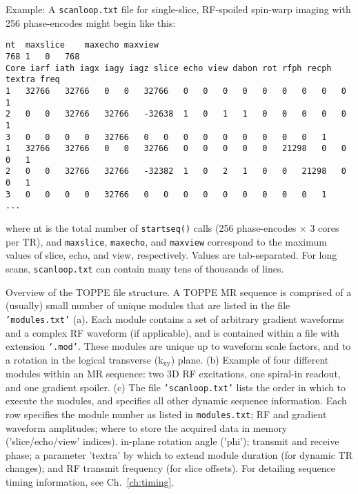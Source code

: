 \begin{comment}
\newcommand\modulenum{1}
\newcommand\rfamp{2}
\newcommand\thetaamp{3}
\newcommand\gxamp{4}
\newcommand\gyamp{5}
\newcommand\gzamp{6}
\newcommand\dabslice{7}
\newcommand\dabecho{8}
\newcommand\dabview{9}
\newcommand\dabmode{10}
\newcommand\inplanerot{11}
\newcommand\txphase{12}
\newcommand\recphase{13}
\newcommand\textra{14}
\newcommand\rffreq{15}
\newcommand\waveformnum{16}
\end{comment}

Example: A {\tt scanloop.txt} file for single-slice, RF-spoiled spin-warp imaging with 256 phase-encodes might begin like this:
\begin{lstlisting}
nt	maxslice	maxecho	maxview
768	1	0	768	
Core iarf iath iagx iagy iagz slice echo view dabon rot rfph recph textra freq
1	32766	32766	0	0	32766	0	0	0	0	0	0	0	0	0	1
2	0	0	32766	32766	-32638	1	0	1	1	0	0	0	0	0	1
3	0	0	0	0	32766	0	0	0	0	0	0	0	0	0	1
1	32766	32766	0	0	32766	0	0	0	0	0	21298	0	0	0	1
2	0	0	32766	32766	-32382	1	0	2	1	0	0	21298	0	0	1
3	0	0	0	0	32766	0	0	0	0	0	0	0	0	0	1
...
\end{lstlisting}
where nt is the total number of {\tt startseq()} calls (256 phase-encodes $\times$ 3 cores per TR), and \texttt{maxslice}, \texttt{maxecho}, and \texttt{maxview} correspond to the maximum values of slice, echo, and view, respectively. %
Values are tab-separated.
For long scans, {\tt scanloop.txt} can contain many tens of thousands of lines.




{
Overview of the TOPPE file structure.
A TOPPE MR sequence is comprised of a (usually) small number of unique modules that are listed in the file \texttt{'modules.txt'} (a).
Each module contains a set of arbitrary gradient waveforms and a complex RF waveform (if applicable), and is contained within a file with extension \texttt{`.mod'}.
These modules are unique up to waveform scale factors, and to a rotation in the logical transverse (k$_\textrm{xy}$) plane.
(b) Example of four different modules within an MR sequence: two 3D RF excitations, one spiral-in readout, and one gradient spoiler.
(c) The file \texttt{'scanloop.txt'} lists the order in which to execute the modules, and specifies all other dynamic sequence information.
Each row specifies the module number as listed in \texttt{modules.txt}; RF and gradient waveform amplitudes;
where to store the acquired data in memory ('slice/echo/view' indices).
in-plane rotation angle ('phi');
transmit and receive phase;
a parameter 'textra' by which to extend module duration (for dynamic TR changes);
and RF transmit frequency (for slice offsets).
For detailing sequence timing information, see Ch.~\ref{ch:timing}.
}


